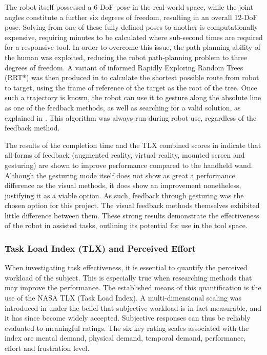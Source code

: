 \documentclass[11pt]{article}
\begin{document}
The robot itself possessed a 6-DoF pose in the real-world space, while the joint angles constitute a further six degrees of freedom, resulting in an overall 12-DoF pose. Solving from one of these fully defined poses to another is computationally expensive, requiring minutes to be calculated where sub-second times are required for a responsive tool. In order to overcome this issue, the path planning ability of the human was exploited, reducing the robot path-planning problem to three degrees of freedom. A variant of informed Rapidly Exploring Random Trees (RRT*) \cite{Gammell2014} was then produced in \cite{GreggSmithFeedback} to calculate the shortest possible route from robot to target, using the frame of reference of the target as the root of the tree. Once such a trajectory is known, the robot can use it to gesture along the absolute line as one of the feedback methods, as well as searching for a valid solution, as explained in \cite{GreggSmithKinematics}. This algorithm was always run during robot use, regardless of the feedback method.

The results of the completion time and the TLX combined scores in \cite{GreggSmithFeedback} indicate that all forms of feedback (augmented reality, virtual reality, mounted screen and gesturing) are shown to improve performance compared to the handheld wand. Although the gesturing mode itself does not show as great a performance difference as the visual methods, it does show an improvement nonetheless, justifying it as a viable option. As such, feedback through gesturing was the chosen option for this project. The visual feedback methods themselves exhibited little difference between them. These strong results demonstrate the effectiveness of the robot in assisted tasks, outlining its potential for use in the tool space.
	

\subsubsection{Task Load Index (TLX) and Perceived Effort}
\label{section:tlx}

When investigating task effectiveness, it is essential to quantify the perceived workload of the subject. This is especially true when researching methods that may improve the performance. The established means of this quantification is the use of the NASA TLX (Task Load Index). A multi-dimensional scaling was introduced in \cite{hart1988} under the belief that subjective workload is in fact measurable, and it has since become widely accepted. Subjective responses can thus be reliably evaluated to meaningful ratings. The six key rating scales associated with the index are mental demand, physical demand, temporal demand, performance, effort and frustration level. 
\end{document}
